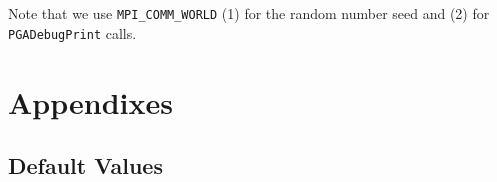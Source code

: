 \documentclass{report}
\begin{document}
Note that we use {\tt MPI\_COMM\_WORLD} (1) for the random number seed and (2)
for {\tt PGADebugPrint} calls.

\part{Appendixes}\label{part:appendices}
\appendix

\chapter{Default Values}\label{app:default-values}
\end{document}
